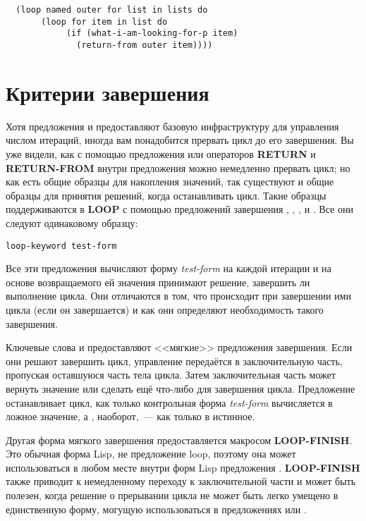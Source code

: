 \begin{lstlisting}
  (loop named outer for list in lists do
       (loop for item in list do
            (if (what-i-am-looking-for-p item)
              (return-from outer item))))
\end{lstlisting}

\section{Критерии завершения}

Хотя предложения  и  предоставляют базовую инфраструктуру для
управления числом итераций, иногда вам понадобится прервать цикл до его завершения. Вы уже
видели, как с помощью предложения  или операторов \textbf{RETURN} и
\textbf{RETURN-FROM} внутри предложения  можно немедленно прервать цикл; но как
есть общие образцы для накопления значений, так существуют и общие образцы для принятия
решений, когда останавливать цикл. Такие образцы поддерживаются в \textbf{LOOP} с помощью
предложений завершения , , ,  и
. Все они следуют одинаковому образцу:

\begin{lstlisting}[style=lisprepl]
    loop-keyword test-form
\end{lstlisting}

Все эти предложения вычисляют форму \textit{test-form} на каждой итерации и на основе
возвращаемого ей значения принимают решение, завершить ли выполнение цикла. Они отличаются
в том, что происходит при завершении ими цикла (если он завершается) и как они определяют
необходимость такого завершения.

Ключевые слова   и  предоставляют <<мягкие>> предложения
завершения. Если они решают завершить цикл, управление передаётся в заключительную часть,
пропуская оставшуюся часть тела цикла. Затем заключительная часть может вернуть значение
или сделать ещё что-либо для завершения цикла. Предложение  останавливает цикл,
как только контрольная форма \textit{test-form} вычисляется в ложное значение, а
, наоборот,~--- как только в истинное.

Другая форма мягкого завершения предоставляется макросом \textbf{LOOP-FINISH}. Это обычная
форма Lisp, не предложение loop, поэтому она может использоваться в любом месте внутри
форм Lisp предложения . \textbf{LOOP-FINISH} также приводит к немедленному
переходу к заключительной части и может быть полезен, когда решение о прерывании цикла не
может быть легко умещено в единственную форму, могущую использоваться в предложениях
 или .

